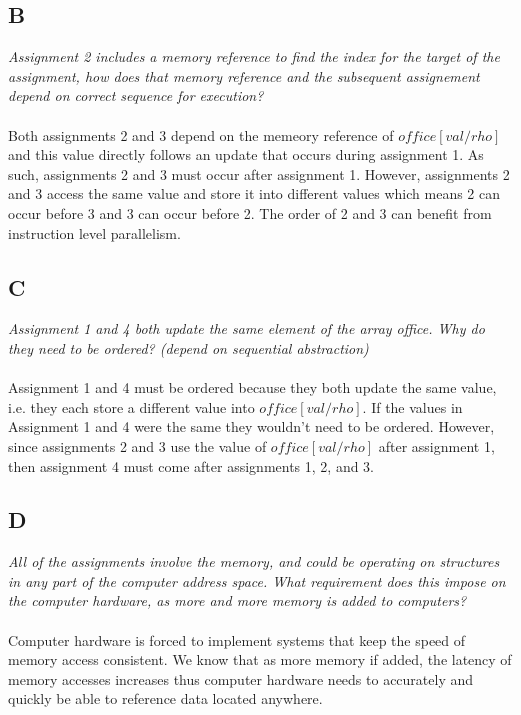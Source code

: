 \documentclass[10pt]{article}
\begin{document}
\subsection{B}
\textit{Assignment 2 includes a memory reference to find the index for the target of the assignment, how does that memory reference and the subsequent assignement depend on
correct sequence for execution?}
\paragraph{} Both assignments 2 and 3 depend on the memeory reference of $office[val/rho]$ and this value directly follows an update that occurs during assignment 1. As such, 
assignments 2 and 3 must occur after assignment 1. However, assignments 2 and 3 access the same value and store it into different values which means 2 can occur before 3 and 3 
can occur before 2. The order of 2 and 3 can benefit from instruction level parallelism. 
\subsection{C}
\textit{Assignment 1 and 4 both update the same element of the array office. Why do they
need to be ordered? (depend on sequential abstraction)}
\paragraph{}Assignment 1 and 4 must be ordered because they both update the same value, i.e. they each store a different value into $office[val/rho]$. 
If the values in Assignment 1 and 4 were the same they wouldn't need to be ordered. However, since assignments 2 and 3 use the value of $office[val/rho]$ after assignment 1,
then assignment 4 must come after assignments 1, 2, and 3.  

\subsection{D}
\textit{All of the assignments involve the memory, and could be operating on structures in
any part of the computer address space. What requirement does this impose on the
computer hardware, as more and more memory is added to computers?
} 
\paragraph{} Computer hardware is forced to implement systems that keep the speed of memory access consistent. We know that
as more memory if added, the latency of memory accesses increases thus computer hardware needs to accurately and quickly be able to reference
data located anywhere. 
\end{document}
